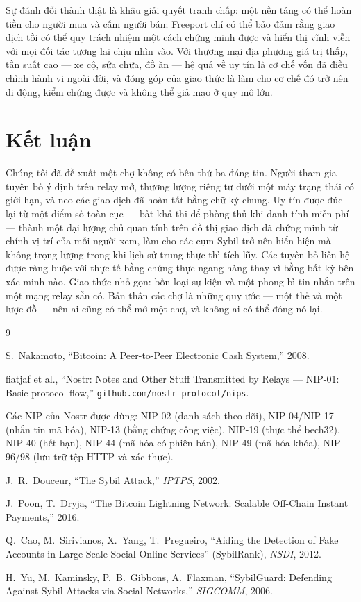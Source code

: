 \documentclass[11pt]{article}
\begin{document}
Sự đánh đổi thành thật là khâu giải quyết tranh chấp: một nền tảng có thể hoàn
tiền cho người mua và cấm người bán; Freeport chỉ có thể bảo đảm rằng giao
dịch tồi có thể quy trách nhiệm một cách chứng minh được và hiển thị vĩnh viễn
với mọi đối tác tương lai chịu nhìn vào. Với thương mại địa phương giá trị
thấp, tần suất cao --- xe cộ, sửa chữa, đồ ăn --- hệ quả về uy tín là cơ chế
vốn đã điều chỉnh hành vi ngoài đời, và đóng góp của giao thức là làm cho cơ
chế đó trở nên di động, kiểm chứng được và không thể giả mạo ở quy mô lớn.

\section{Kết luận}

Chúng tôi đã đề xuất một chợ không có bên thứ ba đáng tin. Người tham gia
tuyên bố ý định trên relay mở, thương lượng riêng tư dưới một máy trạng thái
có giới hạn, và neo các giao dịch đã hoàn tất bằng chữ ký chung. Uy tín được
đúc lại từ một điểm số toàn cục --- bất khả thi để phòng thủ khi danh tính
miễn phí --- thành một đại lượng chủ quan tính trên đồ thị giao dịch đã chứng
minh từ chính vị trí của mỗi người xem, làm cho các cụm Sybil trở nên hiển
hiện mà không trọng lượng trong khi lịch sử trung thực thì tích lũy. Các tuyên
bố liên hệ được ràng buộc với thực tế bằng chứng thực ngang hàng thay vì bằng
bất kỳ bên xác minh nào. Giao thức nhỏ gọn: bốn loại sự kiện và một phong bì
tin nhắn trên một mạng relay sẵn có. Bản thân các chợ là những quy ước --- một
thẻ và một lược đồ --- nên ai cũng có thể mở một chợ, và không ai có thể đóng
nó lại.

\begin{thebibliography}{9}
\small

 S.~Nakamoto, ``Bitcoin: A Peer-to-Peer Electronic Cash
System,'' 2008.

 fiatjaf et al., ``Nostr: Notes and Other Stuff Transmitted
by Relays --- NIP-01: Basic protocol flow,''
\texttt{github.com/nostr-protocol/nips}.

 Các NIP của Nostr được dùng: NIP-02 (danh sách theo dõi),
NIP-04/NIP-17 (nhắn tin mã hóa), NIP-13 (bằng chứng công việc), NIP-19 (thực
thể bech32), NIP-40 (hết hạn), NIP-44 (mã hóa có phiên bản), NIP-49 (mã hóa
khóa), NIP-96/98 (lưu trữ tệp HTTP và xác thực).

 J.~R.~Douceur, ``The Sybil Attack,'' \emph{IPTPS}, 2002.

 J.~Poon, T.~Dryja, ``The Bitcoin Lightning Network:
Scalable Off-Chain Instant Payments,'' 2016.

 Q.~Cao, M.~Sirivianos, X.~Yang, T.~Pregueiro, ``Aiding
the Detection of Fake Accounts in Large Scale Social Online Services''
(SybilRank), \emph{NSDI}, 2012.

 H.~Yu, M.~Kaminsky, P.~B.~Gibbons, A.~Flaxman,
``SybilGuard: Defending Against Sybil Attacks via Social Networks,''
\emph{SIGCOMM}, 2006.

\end{thebibliography}
\end{document}
